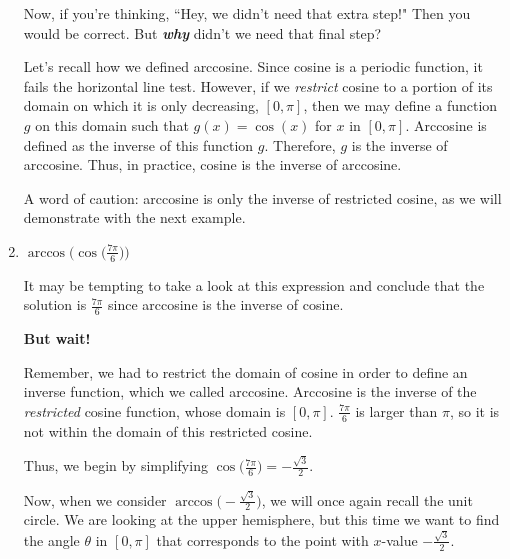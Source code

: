 \documentclass{ximera}
\begin{document}
\begin{example}
\begin{enumerate}
\begin{explanation}
Now, if you're thinking, ``Hey, we didn't need that extra step!" Then you would be correct. But \textbf{\textit{why}} didn't we need that final step?

Let's recall how we defined arccosine. Since cosine is a periodic function, it fails the horizontal line test. However, if we {\it restrict} cosine to a portion of its domain on which it is only decreasing, $[0,\pi]$, then we may define a function $g$ on this domain such that $g(x) = \cos(x)$ for $x$ in $[0,\pi]$. Arccosine is defined as the inverse of this function $g$. Therefore, $g$ is the inverse of arccosine. 
Thus, in practice, cosine is the inverse of arccosine. 

A word of caution: arccosine is only the inverse of restricted cosine, as we will demonstrate with the next example.

\end{explanation}
%
\item $\arccos\Big(\cos\Big(\frac{7\pi}{6}\Big)\Big)$

\begin{explanation}
It may be tempting to take a look at this expression and conclude that the solution is $\frac{7\pi}{6}$ since arccosine is the inverse of cosine. 

{\bf But wait! }

Remember, we had to restrict the domain of cosine in order to define an inverse function, which we called arccosine. Arccosine is the inverse of the {\it restricted} cosine function, whose domain is $[0,\pi]$. $\frac{7\pi}{6}$ is larger than $\pi$, so it is not within the domain of this restricted cosine. 

Thus, we begin by simplifying $\cos\Big(\frac{7\pi}{6}\Big) = -\frac{\sqrt{3}}{2}$. 

Now, when we consider $\arccos\Big(-\frac{\sqrt{3}}{2}\Big)$, we will once again recall the unit circle. We are looking at the upper hemisphere, but this time we want to find the angle $\theta$ in $[0,\pi]$ that corresponds to the point with $x$-value $-\frac{\sqrt{3}}{2}$.
%
\begin{image}
\end{image}
\end{explanation}
\end{enumerate}
\end{example}
\end{document}
